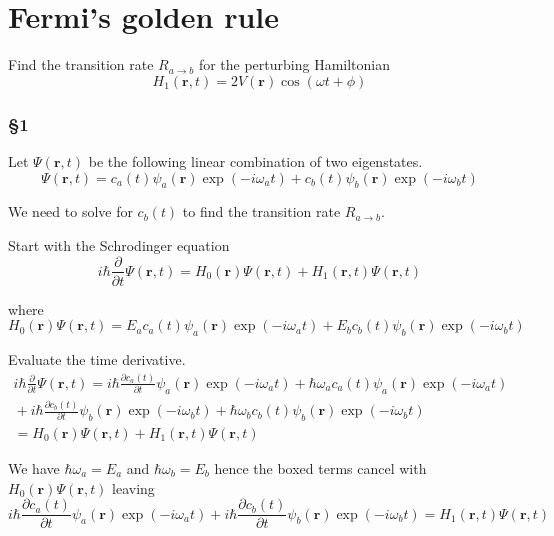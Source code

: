 

\section*{Fermi's golden rule}

Find the transition rate $R_{a\rightarrow b}$ for the perturbing Hamiltonian
\begin{equation*}
H_1(\mathbf r,t)=2V(\mathbf r)\cos(\omega t+\phi)
\end{equation*}

\subsubsection*{\S1}

Let $\Psi(\mathbf r,t)$ be the following linear combination of two eigenstates.
\begin{equation*}
\Psi(\mathbf r,t)=c_a(t)\psi_a(\mathbf r)\exp(-i\omega_at)+c_b(t)\psi_b(\mathbf r)\exp(-i\omega_bt)
\end{equation*}

We need to solve for $c_b(t)$ to find the transition rate $R_{a\rightarrow b}$.

\bigskip

Start with the Schrodinger equation
\begin{equation*}
i\hbar\frac{\partial}{\partial t}\Psi(\mathbf r,t)=H_0(\mathbf r)\Psi(\mathbf r,t)+H_1(\mathbf r,t)\Psi(\mathbf r,t)
\end{equation*}

where
\begin{equation*}
H_0(\mathbf r)\Psi(\mathbf r,t)
=E_ac_a(t)\psi_a(\mathbf r)\exp(-i\omega_at)
+E_bc_b(t)\psi_b(\mathbf r)\exp(-i\omega_bt)
\end{equation*}

Evaluate the time derivative.
\begin{multline*}
i\hbar\frac{\partial}{\partial t}\Psi(\mathbf r,t)
=i\hbar\frac{\partial c_a(t)}{\partial t}\psi_a(\mathbf r)\exp(-i\omega_at)
+\boxed{\hbar\omega_ac_a(t)\psi_a(\mathbf r)\exp(-i\omega_at)}
\\
{}+i\hbar\frac{\partial c_b(t)}{\partial t}\psi_b(\mathbf r)\exp(-i\omega_bt)
+\boxed{\hbar\omega_bc_b(t)\psi_b(\mathbf r)\exp(-i\omega_bt)}
\\
{}=H_0(\mathbf r)\Psi(\mathbf r,t)+H_1(\mathbf r,t)\Psi(\mathbf r,t)
\tag{1}
\end{multline*}

We have $\hbar\omega_a=E_a$ and $\hbar\omega_b=E_b$
hence the boxed terms cancel with $H_0(\mathbf r)\Psi(\mathbf r,t)$ leaving
\begin{equation*}
i\hbar\frac{\partial c_a(t)}{\partial t}\psi_a(\mathbf r)\exp(-i\omega_at)
+i\hbar\frac{\partial c_b(t)}{\partial t}\psi_b(\mathbf r)\exp(-i\omega_bt)
=H_1(\mathbf r,t)\Psi(\mathbf r,t)
\end{equation*}

